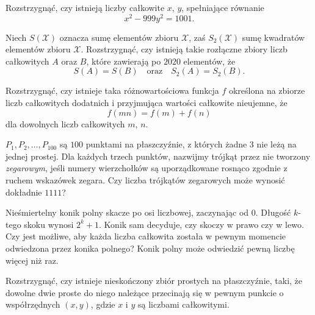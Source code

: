 
\begin{problem}{1}
	Rozstrzygnąć, czy istnieją liczby całkowite $x$, $y$, spełniające równanie
	\[
		x^2 - 999y^2 = 1001.
	\]
\end{problem}

\begin{problem}{2}
	Niech $S(\mathcal{X})$ oznacza sumę elementów zbioru $\mathcal{X}$, zaś $S_2(\mathcal{X})$ sumę kwadratów elementów zbioru $\mathcal{X}$. Rozstrzygnąć, czy istnieją takie rozłączne zbiory liczb całkowitych $A$ oraz $B$, które zawierają po $2020$ elementów, że
	\[
		S(A) = S(B) \quad \text{oraz} \quad S_2(A) = S_2(B).
	\]
\end{problem}


\begin{problem}{3}
	Rozstrzygnąć, czy istnieje taka różnowartościowa funkcja $f$ określona na zbiorze liczb całkowitych dodatnich i przyjmująca wartości całkowite nieujemne, że
	\[
		f(mn) = f(m) + f(n)
	\]
	dla dowolnych liczb całkowitych $m$, $n$.
\end{problem}


\begin{problem}{4}
	$P_1,P_2,\ldots,P_{100}$ są $100$ punktami na płaszczyźnie, z których żadne 3 nie leżą na jednej prostej. Dla każdych trzech punktów, nazwijmy trójkąt przez nie tworzony \textit{zegarowym}, jeśli numery wierzchołków są uporządkowane rosnąco zgodnie z ruchem wskazówek zegara. Czy liczba trójkątów zegarowych może wynosić dokładnie $1111$?
\end{problem}

\begin{problem}{5}
	Nieśmiertelny konik polny skacze po osi liczbowej, zaczynając od $0$. Długość $k$-tego skoku wynosi $2^k + 1$. Konik sam decyduje, czy skoczy w prawo czy w lewo. Czy jest możliwe, aby każda liczba całkowita została w pewnym momencie odwiedzona przez konika polnego? Konik polny może odwiedzić pewną liczbę więcej niż raz.
\end{problem}

\begin{problem}{6}
	Rozstrzygnąć, czy istnieje nieskończony zbiór prostych na płaszczyźnie, taki, że dowolne dwie proste do niego należące przecinają się w pewnym punkcie o współrzędnych $(x, y)$, gdzie $x$ i $y$ są liczbami całkowitymi.
\end{problem}


